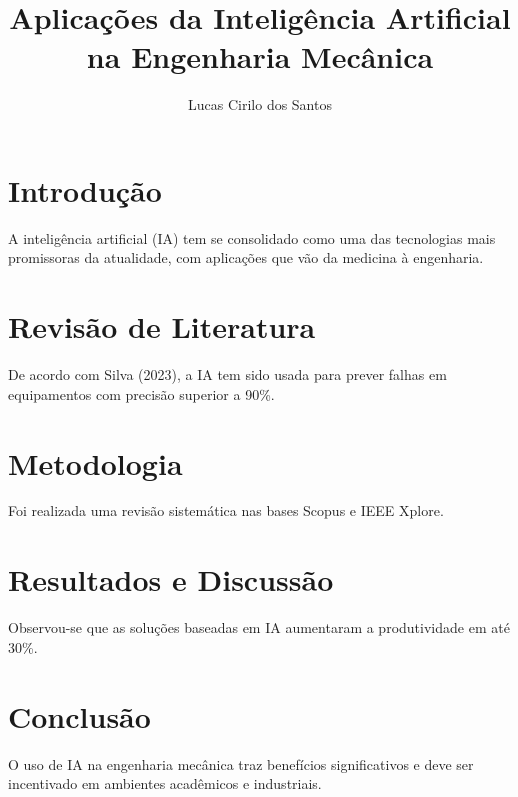 \documentclass{abnt2025}
\title{Aplicações da Inteligência Artificial na Engenharia Mecânica}
\author{Lucas Cirilo dos Santos}
\begin{document}
\maketitle
{}


\section{Introdução}
A inteligência artificial (IA) tem se consolidado como uma das tecnologias mais promissoras da atualidade, com aplicações que vão da medicina à engenharia.

\section{Revisão de Literatura}
De acordo com Silva (2023), a IA tem sido usada para prever falhas em equipamentos com precisão superior a 90\%.

\section{Metodologia}
Foi realizada uma revisão sistemática nas bases Scopus e IEEE Xplore.

\section{Resultados e Discussão}
Observou-se que as soluções baseadas em IA aumentaram a produtividade em até 30\%.

\section{Conclusão}
O uso de IA na engenharia mecânica traz benefícios significativos e deve ser incentivado em ambientes acadêmicos e industriais.



\end{document}
